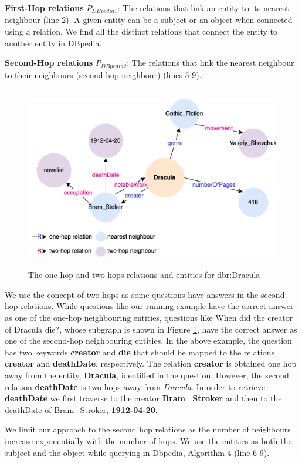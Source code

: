 \begin{sloppypar}
\textbf{First-Hop relations} $P_{DBpedia1}$: The relations that link an entity to its nearest neighbour (line 2). A given entity can be a subject or an object when connected using a relation. We find all the distinct relations that connect the entity to another entity in DBpedia.

\textbf{Second-Hop relations} $P_{DBpedia2}$: The relations that link the nearest neighbour to their neighbours (second-hop neighbour) (lines 5-9). 

\begin{figure}
    \centering
   \includegraphics[width=12cm, height=8cm]{chapters/figures/Hop.png}
    \caption{The one-hop and two-hops relations and entities for dbr:Dracula}
    \label{fig:hop}
\end{figure}

We use the concept of two hops as some questions have answers in the second hop relations. While questions like our running example have the correct answer as one of the one-hop neighbouring entities, questions like {\selectfont When did the creator of Dracula die?}, whose subgraph is shown in Figure \ref{fig:hop}, have the correct answer as one of the second-hop neighbouring entities. In the above example, the question has two keywords \textbf{creator} and \textbf{die} that should be mapped to the relations \textbf{creator} and \textbf{deathDate}, respectively. The relation \textbf{creator} is obtained one hop away from the entity, \textbf{Dracula}, identified in the question. However, the second relation \textbf{deathDate} is two-hops away from \textit{Dracula}. In order to retrieve \textbf{deathDate} we first traverse to the creator \textbf{Bram\_Stroker} and then to the deathDate of Bram\_Stroker, \textbf{1912-04-20}. 

We limit our approach to the second hop relations as the number of neighbours increase exponentially with the number of hops.  We use the entities as both the subject and the object while querying in Dbpedia, Algorithm 4 (line 6-9). 


\end{sloppypar}
